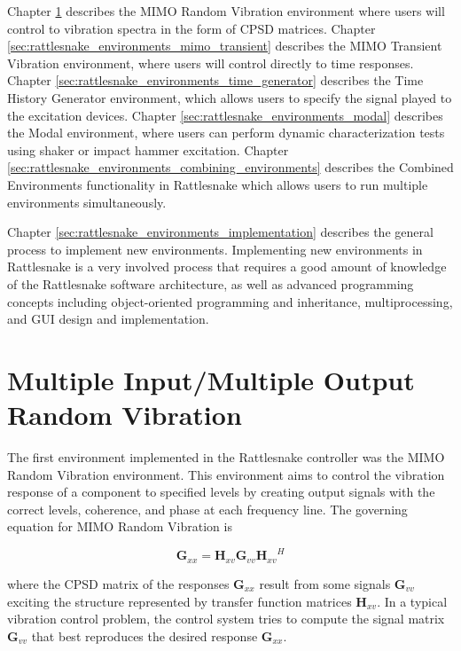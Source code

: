 \documentclass[pdf,12pt,report]{SANDreport}
\begin{document}
    Chapter \ref{sec:rattlesnake_environments_mimo_random} describes the \Ac{MIMO} Random Vibration environment where users will control to vibration spectra in the form of \Ac{CPSD} matrices.  Chapter \ref{sec:rattlesnake_environments_mimo_transient} describes the \Ac{MIMO} Transient Vibration environment, where users will control directly to time responses.  Chapter \ref{sec:rattlesnake_environments_time_generator} describes the Time History Generator environment, which allows users to specify the signal played to the excitation devices.  Chapter \ref{sec:rattlesnake_environments_modal} describes the Modal environment, where users can perform dynamic characterization tests using shaker or impact hammer excitation.  Chapter \ref{sec:rattlesnake_environments_combining_environments} describes the Combined Environments functionality in Rattlesnake which allows users to run multiple environments simultaneously.
    
    Chapter \ref{sec:rattlesnake_environments_implementation} describes the general process to implement new environments.  Implementing new environments in Rattlesnake is a very involved process that requires a good amount of knowledge of the Rattlesnake software architecture, as well as advanced programming concepts including object-oriented programming and inheritance, multiprocessing, and \Ac{GUI} design and implementation.
    
    \chapter{Multiple Input/Multiple Output Random Vibration}\label{sec:rattlesnake_environments_mimo_random}
    
    The first environment implemented in the Rattlesnake controller was the \Ac{MIMO} Random Vibration environment.  This environment aims to control the vibration response of a component to specified levels by creating output signals with the correct levels, coherence, and phase at each frequency line.  The governing equation for \Ac{MIMO} Random Vibration is 
    
    \begin{equation}\label{eq:forward_mimo_vibration}
    \mathbf{G}_{xx} = {\mathbf{H}_{xv}}\mathbf{G}_{vv}{{\mathbf{H}_{xv}}}^H
    \end{equation}
    
    where the \ac{CPSD} matrix of the responses $\mathbf{G}_{xx}$ result from some signals $\mathbf{G}_{vv}$ exciting the structure represented by transfer function matrices $\mathbf{H}_{xv}$.  In a typical vibration control problem, the control system tries to compute the signal matrix $\mathbf{G}_{vv}$ that best reproduces the desired response $\mathbf{G}_{xx}$.
    
\end{document}
